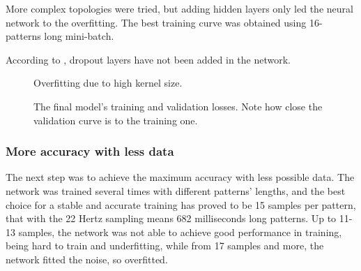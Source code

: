 More complex topologies were tried, but adding hidden layers only led the neural network to the overfitting. The best training curve was obtained using 16-patterns long mini-batch.

According to \cite{Hin12}, dropout layers have not been added in the network.

\begin{center}
	\begin{figure}[ht!]
		\caption{Overfitting due to high kernel size.}
	\end{figure}
\end{center}

\begin{center}
	\begin{figure}[ht!]
		\caption{The final model's training and validation losses. Note how close the validation curve is to the training one.}
	\end{figure}
\end{center}

\subsubsection{More accuracy with less data}
The next step was to achieve the maximum accuracy with less possible data. The network was trained several times with different patterns' lengths, and the best choice for a stable and accurate training has proved to be 15 samples per pattern, that with the 22 Hertz sampling means 682 milliseconds long patterns. Up to 11-13 samples, the network was not able to achieve good performance in training, being hard to train and underfitting, while from 17 samples and more, the network fitted the noise, so overfitted.

